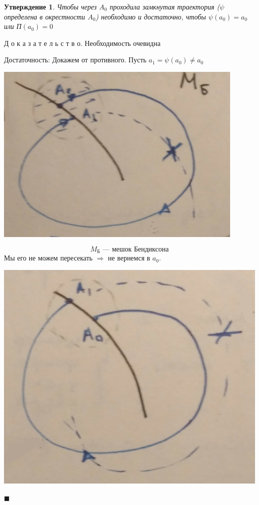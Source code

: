 \documentclass[oneside, final, 12pt]{article}
\theoremstyle{def}
\theoremstyle{th}
\newtheorem{assertion}{Утверждение}[section]
\theoremstyle{rem}
\renewenvironment{proof}{\par Д о к а з а т е л ь с т в о.}{\hfill$\blacksquare$}
\numberwithin{figure}{section}
\numberwithin{equation}{section}
\begin{document}
	\begin{assertion}{\label{afKul}}
		Чтобы через $A_0$ проходила замкнутая траектория ($\psi$ определена в окрестности $A_0$)
			необходимо и достаточно, чтобы $\psi(a_0)=a_0$ или П$(a_0) = 0$
	\end{assertion}
	\begin{proof} Необходимость  очевидна \newline
	
		Достаточность: Докажем от противного. Пусть $a_1 =\psi(a_0) \neq a_0$ \newline
		\begin{minipage}{0.35\textwidth} 
			\vspace{3mm}
			\begin{center} \includegraphics[width=0.9\textwidth]{pict/pict_2_1.png} \end{center} 
			$$M_\text{Б}\text{ --- мешок Бендиксона}$$
			Мы его не можем пересекать $\Rightarrow$ \newline 
			\hspace*{15mm} не вернемся в $a_0$.
		\end{minipage}
			\hfill
		\begin{minipage}{0.32\textwidth}
			\begin{center} \includegraphics[width=1\textwidth]{pict/pict_2_2.png} \end{center} 

\end{minipage}
\end{proof}
\end{document}
